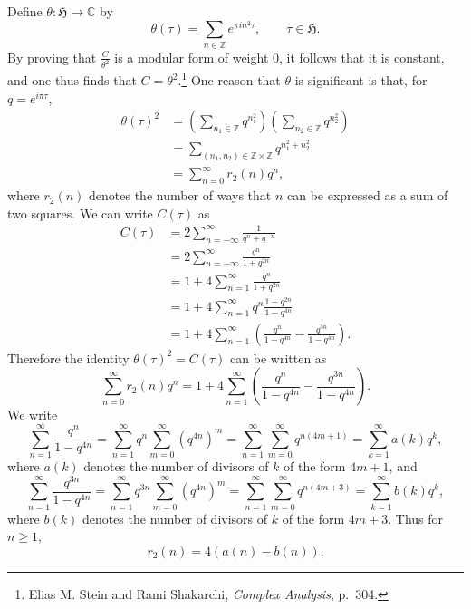 \documentclass{article}
\theoremstyle{definition}
\begin{document}
Define $\theta:\mathfrak{H} \to \mathbb{C}$
by
\[
\theta(\tau) = \sum_{n \in \mathbb{Z}} e^{\pi in^2 \tau}, \qquad \tau \in \mathfrak{H}.
\]
By proving that $\frac{C}{\theta^2}$ is a modular form of weight $0$, it follows that it is constant, and one thus
finds that $C=\theta^2$.\footnote{Elias M. Stein and Rami Shakarchi, {\em Complex Analysis},
p.~304.}
One reason that $\theta$ is significant is that, for $q=e^{i\pi \tau}$,
\begin{align*}
\theta(\tau)^2 &= \left(\sum_{n_1 \in \mathbb{Z}} q^{n_1^2} \right)
\left(\sum_{n_2 \in \mathbb{Z}} q^{n_2^2} \right)\\
&=\sum_{(n_1,n_2) \in \mathbb{Z} \times \mathbb{Z}}
q^{n_1^2+n_2^2}\\
&=\sum_{n=0}^\infty r_2(n) q^n,
\end{align*}
where $r_2(n)$ denotes the number of ways that $n$ can be expressed as a sum of two squares. 
We can write $C(\tau)$ as
\begin{align*}
C(\tau) &= 2\sum_{n =-\infty}^\infty \frac{1}{q^n+q^{-n}}\\
&=2\sum_{n=-\infty}^\infty \frac{q^n}{1+q^{2n}}\\
&=1+4\sum_{n=1}^\infty \frac{q^n}{1+q^{2n}}\\
&=1+4 \sum_{n=1}^\infty q^n \frac{1-q^{2n}}{1-q^{4n}}\\
&=1+4 \sum_{n=1}^\infty \left( \frac{q^n}{1-q^{4n}}
-\frac{q^{3n}}{1-q^{4n}}\right).
\end{align*}
Therefore the identity $\theta(\tau)^2 = C(\tau)$ can be written as
\[
\sum_{n=0}^\infty r_2(n) q^n =1+4 \sum_{n=1}^\infty \left( \frac{q^n}{1-q^{4n}}
-\frac{q^{3n}}{1-q^{4n}}\right).
\]
We write
\[
\sum_{n=1}^\infty \frac{q^n}{1-q^{4n}} =\sum_{n=1}^\infty q^n \sum_{m=0}^\infty (q^{4n})^m
=\sum_{n=1}^\infty \sum_{m=0}^\infty q^{n(4m+1)}
=\sum_{k=1}^\infty a(k) q^k,
\]
where $a(k)$ denotes the number of divisors of $k$ of the form $4m+1$,
and
\[
\sum_{n=1}^\infty \frac{q^{3n}}{1-q^{4n}} =\sum_{n=1}^\infty q^{3n} \sum_{m=0}^\infty (q^{4n})^m
=\sum_{n=1}^\infty \sum_{m=0}^\infty q^{n(4m+3)}
=\sum_{k=1}^\infty b(k) q^k,
\]
where $b(k)$ denotes the number of divisors of $k$ of the form $4m+3$. Thus for $n \geq 1$,
\[
r_2(n) = 4(a(n)-b(n)).
\]
\end{document}

